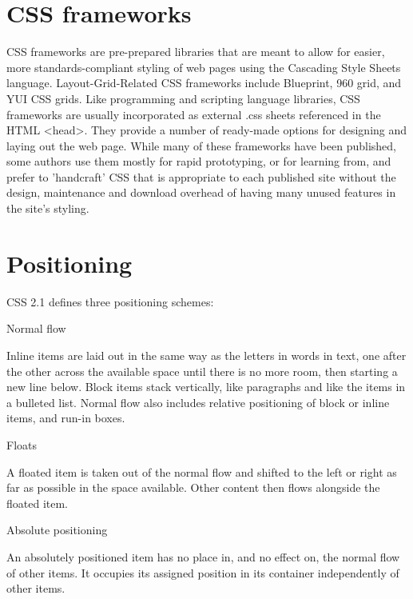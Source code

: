 \chapter{CSS frameworks}


CSS frameworks are pre-prepared libraries that are meant to allow for easier, more standards-compliant styling of web pages using the Cascading Style Sheets language. Layout-Grid-Related CSS frameworks include Blueprint, 960 grid, and YUI CSS grids. Like programming and scripting language libraries, CSS frameworks are usually incorporated as external .css sheets referenced in the HTML <head>. They provide a number of ready-made options for designing and laying out the web page. While many of these frameworks have been published, some authors use them mostly for rapid prototyping, or for learning from, and prefer to 'handcraft' CSS that is appropriate to each published site without the design, maintenance and download overhead of having many unused features in the site's styling.



\chapter{Positioning}


CSS 2.1 defines three positioning schemes:

\begin{compactitem}
\item Normal flow


Inline items are laid out in the same way as the letters in words in text, one after the other across the available space until there is no more room, then starting a new line below. Block items stack vertically, like paragraphs and like the items in a bulleted list. Normal flow also includes relative positioning of block or inline items, and run-in boxes.


\item Floats

A floated item is taken out of the normal flow and shifted to the left or right as far as possible in the space available. Other content then flows alongside the floated item.

\item Absolute positioning

An absolutely positioned item has no place in, and no effect on, the normal flow of other items. It occupies its assigned position in its container independently of other items.


\end{compactitem}



